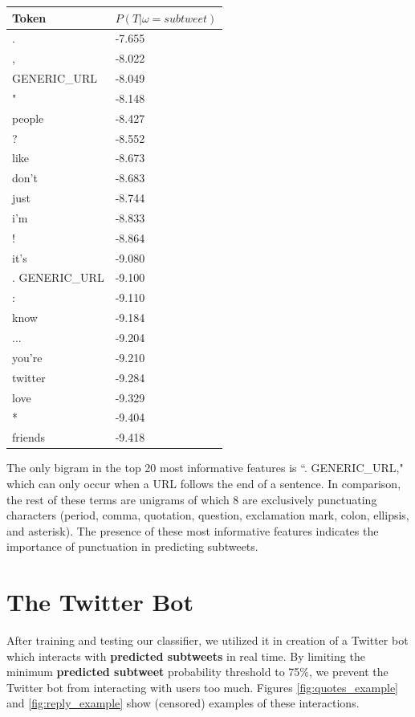 \documentclass[11pt, twoside, reqno]{book}
\begin{document}
\begin{center}
\begin{tabular}{ | p{8em} | p{8.5em} | }
\hline
Token & $P(T|\omega=subtweet)$ \\ \hline
.       & -7.655 \\
,       & -8.022 \\
GENERIC\_URL& -8.049 \\
"       & -8.148 \\
people  & -8.427 \\
?       & -8.552 \\
like    & -8.673 \\
don't   & -8.683 \\
just    & -8.744 \\
i'm     & -8.833 \\
!       & -8.864 \\
it's    & -9.080 \\
. GENERIC\_URL   & -9.100 \\
:       & -9.110 \\
know    & -9.184 \\
...     & -9.204 \\
you're  & -9.210 \\
twitter & -9.284 \\
love    & -9.329 \\
*       & -9.404 \\
friends & -9.418 \\
\hline
\end{tabular}
\end{center}

\noindent
The only bigram in the top 20 most informative features is ``. GENERIC\_URL," which can only occur when a URL follows the end of a sentence. In comparison, the rest of these terms are unigrams of which 8 are exclusively punctuating characters (period, comma, quotation, question, exclamation mark, colon, ellipsis, and asterisk). The presence of these most informative features indicates the importance of punctuation in predicting subtweets. 

\section{The Twitter Bot}
\label{the_twitter_bot}

After training and testing our classifier, we utilized it in creation of a Twitter bot which interacts with \textbf{predicted subtweets} in real time. By limiting the minimum \textbf{predicted subtweet} probability threshold to 75\%, we prevent the Twitter bot from interacting with users too much. Figures \ref{fig:quotes_example} and \ref{fig:reply_example} show (censored) examples of these interactions.
\end{document}
